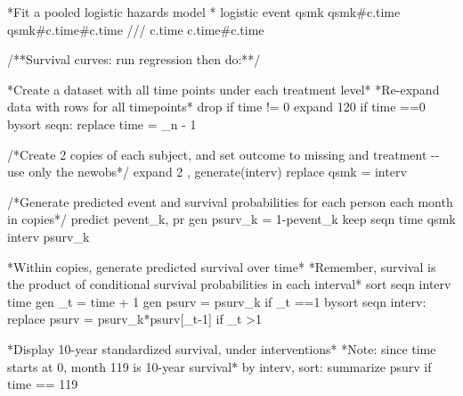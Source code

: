 \documentclass[
  10pt,
  a4paper,
]{book}
\newenvironment{Shaded}{\begin{snugshade}}{\end{snugshade}}
\newcommand{\BaseNTok}[1]{\textcolor[rgb]{0.68,0.00,0.00}{#1}}
\newcommand{\CommentTok}[1]{\textcolor[rgb]{0.37,0.37,0.37}{#1}}
\newcommand{\DataTypeTok}[1]{\textcolor[rgb]{0.68,0.00,0.00}{#1}}
\newcommand{\DecValTok}[1]{\textcolor[rgb]{0.68,0.00,0.00}{#1}}
\newcommand{\FunctionTok}[1]{\textcolor[rgb]{0.28,0.35,0.67}{#1}}
\newcommand{\KeywordTok}[1]{\textcolor[rgb]{0.00,0.46,0.62}{#1}}
\newcommand{\NormalTok}[1]{\textcolor[rgb]{0.00,0.46,0.62}{#1}}
\newcommand{\OtherTok}[1]{\textcolor[rgb]{0.00,0.46,0.62}{#1}}
\begin{document}
\begin{Shaded}
\begin{Highlighting}[]
\NormalTok{*Fit a pooled }\KeywordTok{logistic}\NormalTok{ hazards }\KeywordTok{model}\NormalTok{ *}
\KeywordTok{logistic}\NormalTok{ event qsmk qsmk\#c.time qsmk\#c.time\#c.time }\CommentTok{///}
\NormalTok{  c.time c.time\#c.time }

\CommentTok{/**Survival curves: run regression then do:**/}

\NormalTok{*Create a dataset with }\OtherTok{all}\NormalTok{ time points under each treatment }\DecValTok{level}\NormalTok{*}
\NormalTok{*Re{-}expand }\KeywordTok{data}\NormalTok{ with }\BaseNTok{rows} \KeywordTok{for} \OtherTok{all}\NormalTok{ timepoints*}
\KeywordTok{drop} \KeywordTok{if}\NormalTok{ time != 0}
\NormalTok{expand 120 }\KeywordTok{if}\NormalTok{ time ==0 }
\KeywordTok{bysort}\NormalTok{ seqn: }\KeywordTok{replace}\NormalTok{ time = }\DataTypeTok{\_n}\NormalTok{ {-} 1   }
        
\CommentTok{/*Create 2 copies of each subject, and set outcome to missing }
\CommentTok{and treatment {-}{-} use only the newobs*/}
\NormalTok{expand 2 , }\KeywordTok{generate}\NormalTok{(interv) }
\KeywordTok{replace}\NormalTok{ qsmk = interv   }

\CommentTok{/*Generate predicted event and survival probabilities }
\CommentTok{for each person each month in copies*/}
\KeywordTok{predict}\NormalTok{ pevent\_k, pr}
\KeywordTok{gen}\NormalTok{ psurv\_k = 1{-}pevent\_k}
\KeywordTok{keep}\NormalTok{ seqn time qsmk interv psurv\_k }

\NormalTok{*Within copies, }\KeywordTok{generate}\NormalTok{ predicted survival }\BaseNTok{over}\NormalTok{ time*}
\NormalTok{*Remember, survival is the product }\KeywordTok{of}\NormalTok{ conditional survival probabilities }\KeywordTok{in}\NormalTok{ each interval*  }
\KeywordTok{sort}\NormalTok{ seqn interv time}
\KeywordTok{gen}\NormalTok{ \_t = time + 1}
\KeywordTok{gen}\NormalTok{ psurv = psurv\_k }\KeywordTok{if}\NormalTok{ \_t ==1       }
\KeywordTok{bysort}\NormalTok{ seqn interv: }\KeywordTok{replace}\NormalTok{ psurv = psurv\_k*psurv[\_t{-}1] }\KeywordTok{if}\NormalTok{ \_t \textgreater{}1 }

\NormalTok{*Display 10{-}}\FunctionTok{year}\NormalTok{ standardized survival, under interventions*}
\NormalTok{*Note: since time starts }\FunctionTok{at}\NormalTok{ 0, }\FunctionTok{month}\NormalTok{ 119 is 10{-}}\FunctionTok{year}\NormalTok{ survival*}
\KeywordTok{by}\NormalTok{ interv, }\KeywordTok{sort}\NormalTok{: }\KeywordTok{summarize}\NormalTok{ psurv }\KeywordTok{if}\NormalTok{ time == 119}


\end{Highlighting}
\end{Shaded}
\end{document}
